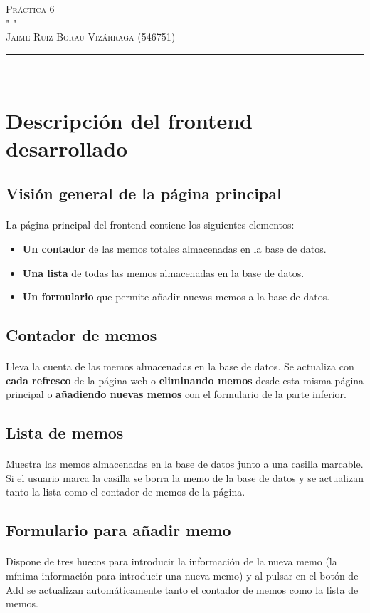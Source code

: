 \documentclass[a4paper]{article}
\newcommand{\HRule}{\rule{\linewidth}{0.35mm}} %
\begin{document}
\marginsize{3cm}{3cm}{2.5cm}{2.5cm} 

\begin{flushright}
	\textsc{\huge Práctica 6\\}
	\textsc{\tiny " "\\}
	\textsc{\large
		Jaime Ruiz-Borau Vizárraga (546751)\\
	}
	\HRule \\
\end{flushright}

\section{Descripción del frontend desarrollado}
\setcounter{page}{1}
\subsection{Visión general de la página principal}
\paragraph{}La página principal del frontend contiene los siguientes elementos:
\begin{itemize}
	\item \textbf{Un contador} de las memos totales almacenadas en la base de datos.
	\item \textbf{Una lista} de todas las memos almacenadas en la base de datos.
	\item \textbf{Un formulario} que permite añadir nuevas memos a la base de datos.
\end{itemize}
\subsection{Contador de memos}
\paragraph{}Lleva la cuenta de las memos almacenadas en la base de datos. Se actualiza con \textbf{cada refresco} de la página web o \textbf{eliminando memos} desde esta misma página principal o \textbf{añadiendo nuevas memos} con el formulario de la parte inferior.
\subsection{Lista de memos}
\paragraph{}Muestra las memos almacenadas en la base de datos junto a una casilla marcable. Si el usuario marca la casilla se borra la memo de la base de datos y se actualizan tanto la lista como el contador de memos de la página.
\subsection{Formulario para añadir memo}
\paragraph{}Dispone de tres huecos para introducir la información de la nueva memo (la mínima información para introducir una nueva memo) y al pulsar en el botón de Add se actualizan automáticamente tanto el contador de memos como la lista de memos.
\end{document}

